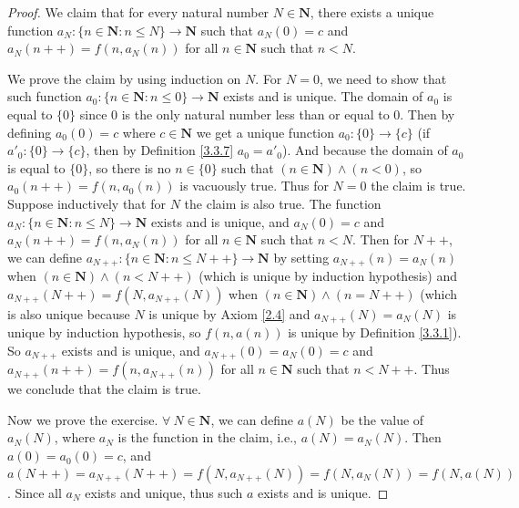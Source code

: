 \begin{proof}
We claim that for every natural number \(N \in \mathbf{N}\), there exists a unique function \(a_N : \{n \in \mathbf{N} : n \leq N\} \to \mathbf{N}\) such that \(a_N(0) = c\) and \(a_N(n++) = f(n, a_{N}(n))\) for all \(n \in \mathbf{N}\) such that \(n < N\).

We prove the claim by using induction on \(N\).
For \(N = 0\), we need to show that such function \(a_0 : \{n \in \mathbf{N} : n \leq 0\} \to \mathbf{N}\) exists and is unique.
The domain of \(a_0\) is equal to \(\{0\}\) since \(0\) is the only natural number less than or equal to \(0\).
Then by defining \(a_0(0) = c\) where \(c \in \mathbf{N}\) we get a unique function \(a_0 : \{0\} \to \{c\}\) (if \(a'_0 : \{0\} \to \{c\}\), then by Definition \ref{3.3.7} \(a_0 = a'_0\)).
And because the domain of \(a_0\) is equal to \(\{0\}\), so there is no \(n \in \{0\}\) such that \((n \in \mathbf{N}) \land (n < 0)\), so \(a_0(n++) = f(n, a_0(n))\) is vacuously true.
Thus for \(N = 0\) the claim is true.
Suppose inductively that for \(N\) the claim is also true.
The function \(a_N : \{n \in \mathbf{N} : n \leq N\} \to \mathbf{N}\) exists and is unique, and \(a_N(0) = c\) and \(a_N(n++) = f(n, a_N(n))\) for all \(n \in \mathbf{N}\) such that \(n < N\).
Then for \(N++\), we can define \(a_{N++} : \{n \in \mathbf{N} : n \leq N++\} \to \mathbf{N}\) by setting \(a_{N++}(n) = a_N(n)\) when \((n \in \mathbf{N}) \land (n < N++)\) (which is unique by induction hypothesis) and \(a_{N++}(N++) = f(N, a_{N++}(N))\) when \((n \in \mathbf{N}) \land (n = N++)\) (which is also unique because \(N\) is unique by Axiom \ref{2.4} and \(a_{N++}(N) = a_N(N)\) is unique by induction hypothesis, so \(f(n, a(n))\) is unique by Definition \ref{3.3.1}).
So \(a_{N++}\) exists and is unique, and \(a_{N++}(0) = a_N(0) = c\) and \(a_{N++}(n++) = f(n, a_{N++}(n))\) for all \(n \in \mathbf{N}\) such that \(n < N++\).
Thus we conclude that the claim is true.

Now we prove the exercise.
\(\forall\ N \in \mathbf{N}\), we can define \(a(N)\) be the value of \(a_N(N)\), where \(a_N\) is the function in the claim, i.e., \(a(N) = a_{N}(N)\).
Then \(a(0) = a_0(0) = c\), and \(a(N++) = a_{N++}(N++) = f(N, a_{N++}(N)) = f(N, a_{N}(N)) = f(N, a(N))\).
Since all \(a_N\) exists and unique, thus such \(a\) exists and is unique.
\end{proof}

